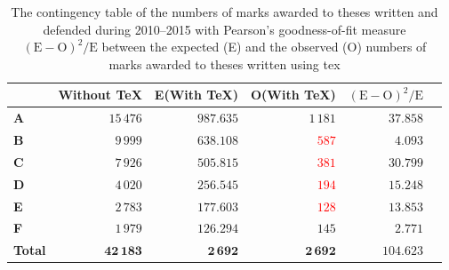 \documentclass[digital,table,color]{fithesis3/fithesis3}
\begin{document}
  \begin{table}
    \caption{The contingency table of the numbers of marks awarded
      to theses written and defended during 2010--2015 with
      Pearson's goodness-of-fit measure
      $(\text{E}-\text{O})^2/\text{E}$ between the expected (E)
      and the observed (O) numbers of marks awarded to theses
      written using \gls{tex}}
    \begin{tabularx}{\textwidth}{Xrrrrr}
      &\textbf{Without \TeX}&E(\textbf{With \TeX})
      &O(\textbf{With \TeX})&$(\text{E}-\text{O})^2/\text{E}$
      \\ \toprule
      \textbf{\parbox[t]{1em}{\centering A}} 
        &$15\,476$&$987.635$&\textcolor{OliveGreen}{$1\,181$}&
        $37.858$\\
      \textbf{\parbox[t]{1em}{\centering B}}
        &$9\,999$&$638.108$&\textcolor{red}{$587$}&$4.093$\\
      \textbf{\parbox[t]{1em}{\centering C}}
        &$7\,926$&$505.815$&\textcolor{red}{$381$}&$30.799$\\
      \textbf{\parbox[t]{1em}{\centering D}}
        &$4\,020$&$256.545$&\textcolor{red}{$194$}&$15.248$\\
      \textbf{\parbox[t]{1em}{\centering E}}
        &$2\,783$&$177.603$&\textcolor{red}{$128$}&$13.853$\\
      \textbf{\parbox[t]{1em}{\centering F}}
        &$1\,979$&$126.294$&\textcolor{OliveGreen}{$145$}&
        $2.771$\\
      \bottomrule
      \textbf{Total} &$\mathbf{42\,183}$&$\mathbf{2\,692}$&
        $\mathbf{2\,692}$&$\mathbf{104.623}$
    \end{tabularx}
    \label{table:statistics-contingency}
  \end{table}
\end{document}
